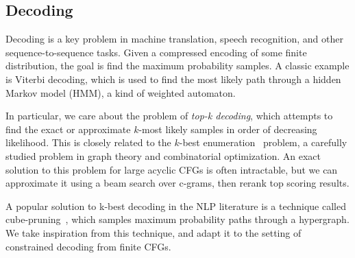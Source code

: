\documentclass[sigplan,review,acmsmall,nonacm,screen,anonymous]{acmart}\settopmatter{printfolios=false,printccs=false,printacmref=false}
\begin{document}
%

\subsection{Decoding}\label{sec:decoding}

Decoding is a key problem in machine translation, speech recognition, and other sequence-to-sequence tasks. Given a compressed encoding of some finite distribution, the goal is find the maximum probability samples. A classic example is Viterbi decoding, which is used to find the most likely path through a hidden Markov model (HMM), a kind of weighted automaton.

In particular, we care about the problem of \textit{top-k decoding}, which attempts to find the exact or approximate $k$-most likely samples in order of decreasing likelihood. This is closely related to the $k$-best enumeration~\cite{eppstein2014k} problem, a carefully studied problem in graph theory and combinatorial optimization. An exact solution to this problem for large acyclic CFGs is often intractable, but we can approximate it using a beam search over c-grams, then rerank top scoring results.

A popular solution to k-best decoding in the NLP literature is a technique called cube-pruning~\cite{huang2005better, chiang2007hierarchical}, which samples maximum probability paths through a hypergraph. We take inspiration from this technique, and adapt it to the setting of constrained decoding from finite CFGs.
\end{document}
